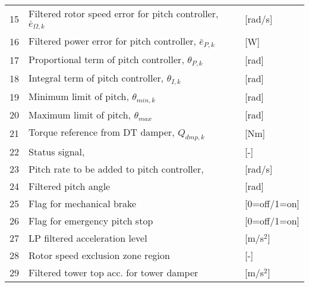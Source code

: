 \begin{table}[t]
\begin{tabular}{r|ll}
15& Filtered rotor speed error for pitch controller, $\bar e_{\Omega,k}$ &[rad/s]\\     %
16& Filtered power error for pitch controller, $\bar e_{P,k}$        &[W]\\             %
17& Proportional term of pitch controller, $\theta_{P,k}$            &[rad]\\           %
18& Integral term of pitch controller, $\theta_{I,k}$                &[rad]\\           %
19& Minimum limit of pitch, $\theta_{min,k}$                         &[rad]\\           %
20& Maximum limit of pitch, $\theta_{max}$                           &[rad]\\           %
21& Torque reference from DT damper, $Q_{dmp,k}$                     &[Nm] \\           %
22& Status signal,                                                   &[-] \\            %
23& Pitch rate to be added to pitch controller,                      &[rad/s]\\         %
24& Filtered pitch angle                                             & [rad]\\          %
25& Flag for mechanical brake                                        & [0=off/1=on]\\   %
26& Flag for emergency pitch stop                                    & [0=off/1=on]\\   %
27& LP filtered acceleration level                                   & [m/s${}^2$]\\    %
28& Rotor speed exclusion zone region                                & [-]\\            %
29& Filtered tower top acc. for tower damper                         &[m/s${}^2$]\\     %

\end{tabular}
\end{table}
